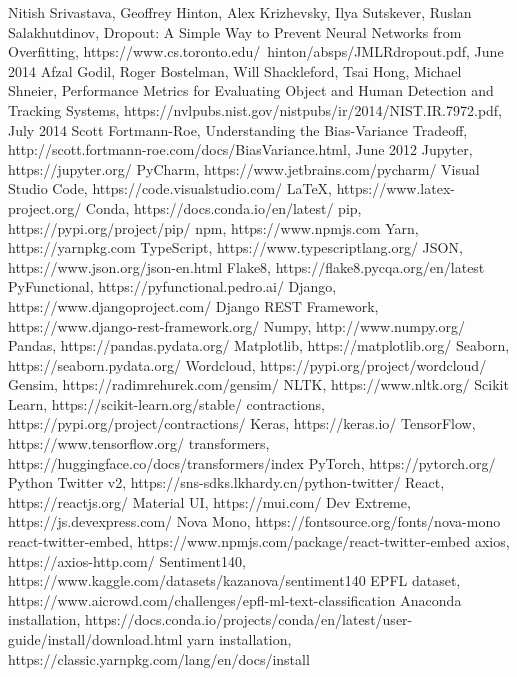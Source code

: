 \documentclass{article}
\begin{document}
\begin{thebibliography}{10}
Nitish Srivastava, Geoffrey Hinton, Alex Krizhevsky, Ilya Sutskever, Ruslan Salakhutdinov, Dropout: A Simple Way to Prevent Neural Networks from Overfitting, https://www.cs.toronto.edu/~hinton/absps/JMLRdropout.pdf, June 2014
Afzal Godil, Roger Bostelman, Will Shackleford, Tsai Hong, Michael Shneier, Performance Metrics for Evaluating Object and Human Detection and Tracking Systems, https://nvlpubs.nist.gov/nistpubs/ir/2014/NIST.IR.7972.pdf, July 2014
Scott Fortmann-Roe, Understanding the Bias-Variance Tradeoff, http://scott.fortmann-roe.com/docs/BiasVariance.html, June 2012
Jupyter, https://jupyter.org/
PyCharm, https://www.jetbrains.com/pycharm/
Visual Studio Code, https://code.visualstudio.com/
LaTeX, https://www.latex-project.org/
Conda, https://docs.conda.io/en/latest/
pip, https://pypi.org/project/pip/
npm, https://www.npmjs.com
Yarn, https://yarnpkg.com
TypeScript, https://www.typescriptlang.org/
JSON, https://www.json.org/json-en.html
Flake8, https://flake8.pycqa.org/en/latest
PyFunctional, https://pyfunctional.pedro.ai/
Django, https://www.djangoproject.com/
Django REST Framework, https://www.django-rest-framework.org/
Numpy, http://www.numpy.org/
Pandas, https://pandas.pydata.org/
Matplotlib, https://matplotlib.org/
Seaborn, https://seaborn.pydata.org/
Wordcloud, https://pypi.org/project/wordcloud/
Gensim, https://radimrehurek.com/gensim/
NLTK, https://www.nltk.org/
Scikit Learn, https://scikit-learn.org/stable/
contractions, https://pypi.org/project/contractions/
Keras, https://keras.io/
TensorFlow, https://www.tensorflow.org/
transformers, https://huggingface.co/docs/transformers/index
PyTorch, https://pytorch.org/
Python Twitter v2, https://sns-sdks.lkhardy.cn/python-twitter/
React, https://reactjs.org/
Material UI, https://mui.com/
Dev Extreme, https://js.devexpress.com/
Nova Mono, https://fontsource.org/fonts/nova-mono
react-twitter-embed, https://www.npmjs.com/package/react-twitter-embed
axios, https://axios-http.com/
Sentiment140, https://www.kaggle.com/datasets/kazanova/sentiment140
EPFL dataset, https://www.aicrowd.com/challenges/epfl-ml-text-classification
Anaconda installation, https://docs.conda.io/projects/conda/en/latest/user-guide/install/download.html
yarn installation, https://classic.yarnpkg.com/lang/en/docs/install
\end{thebibliography}
\end{document}
